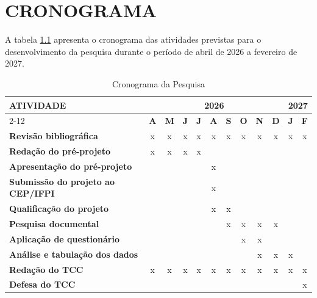 \chapter{CRONOGRAMA} \label{cha:cronograma}

A tabela \ref{qua:cronograma} apresenta o cronograma das atividades previstas para o desenvolvimento da pesquisa durante o período de abril de 2026 a fevereiro de 2027.


\begin{table}[H]
    \caption{Cronograma da Pesquisa}
    \label{qua:cronograma}
    \centering
    \small
    \begin{tabular}{|p{4.2cm}|c|c|c|c|c|c|c|c|c|c|c|}
        \hline
        \textbf{ATIVIDADE} & \multicolumn{9}{c|}{\textbf{2026}} & \multicolumn{2}{c|}{\textbf{2027}} \\ \cline{2-12}
        & \textbf{A} & \textbf{M} & \textbf{J} & \textbf{J} & \textbf{A} & \textbf{S} & \textbf{O} & \textbf{N} & \textbf{D} & \textbf{J} & \textbf{F} \\ \hline

        \textbf{Revisão bibliográfica}
        & x & x & x & x & x & x & x & x & x & x & x \\ \hline

        \textbf{Redação do pré-projeto}
        & x & x & x & x & & & & & & & \\ \hline

        \textbf{Apresentação do pré-projeto}
        & & & & & x & & & & & & \\ \hline

        \textbf{Submissão do projeto ao CEP/IFPI}
        & & & & & x & & & & & & \\ \hline

        \textbf{Qualificação do projeto}
        & & & & & x & x & & & & & \\ \hline

        \textbf{Pesquisa documental}
        & & & & & & x & x & x & x & & \\ \hline

        \textbf{Aplicação de questionário}
        & & & & & & & x & x & & & \\ \hline

        \textbf{Análise e tabulação dos dados}
        & & & & & & & & x & x & x & \\ \hline

        \textbf{Redação do TCC}
        & x & x & x & x & x & x & x & x & x & x & x \\ \hline

        \textbf{Defesa do TCC}
        & & & & & & & & & & & x \\ \hline
    \end{tabular}
\end{table}